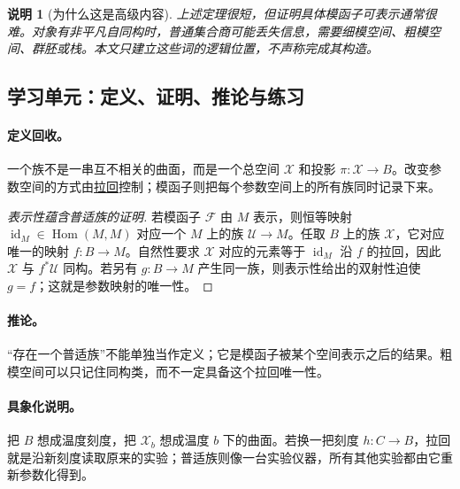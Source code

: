 \documentclass[UTF8,fontset=none,a4paper,11pt]{ctexart}
\theoremstyle{foundation-definition}
\theoremstyle{foundation-theorem}
\theoremstyle{foundation-proposition}
\theoremstyle{foundation-example}
\theoremstyle{foundation-remark}
\newtheorem{remark}[definition]{说明}
\theoremstyle{foundation-theorem}
\newcommand{\term}[2]{\hyperref[#1]{#2}}
\begin{document}
\begin{remark}[为什么这是高级内容]
上述定理很短，但证明具体模函子可表示通常很难。对象有非平凡自同构时，普通集合商可能丢失信息，需要细模空间、粗模空间、群胚或栈。本文只建立这些词的逻辑位置，不声称完成其构造。
\end{remark}

\subsection{学习单元：定义、证明、推论与练习}

\paragraph{定义回收。}
一个族不是一串互不相关的曲面，而是一个总空间 \(\mathcal X\) 和投影 \(\pi:\mathcal X\to B\)。改变参数空间的方式由\term{def:pullback}{拉回}控制；模函子则把每个参数空间上的所有族同时记录下来。

\begin{proof}[表示性蕴含普适族的证明]
若模函子 \(\mathcal F\) 由 \(M\) 表示，则恒等映射 \(\operatorname{id}_M\in\operatorname{Hom}(M,M)\) 对应一个 \(M\) 上的族 \(\mathcal U\to M\)。任取 \(B\) 上的族 \(\mathcal X\)，它对应唯一的映射 \(f:B\to M\)。自然性要求 \(\mathcal X\) 对应的元素等于 \(\operatorname{id}_M\) 沿 \(f\) 的拉回，因此 \(\mathcal X\) 与 \(f^*\mathcal U\) 同构。若另有 \(g:B\to M\) 产生同一族，则表示性给出的双射性迫使 \(g=f\)；这就是参数映射的唯一性。
\end{proof}

\paragraph{推论。}
“存在一个普适族”不能单独当作定义；它是模函子被某个空间表示之后的结果。粗模空间可以只记住同构类，而不一定具备这个拉回唯一性。

\paragraph{具象化说明。}
把 \(B\) 想成温度刻度，把 \(\mathcal X_b\) 想成温度 \(b\) 下的曲面。若换一把刻度 \(h:C\to B\)，拉回就是沿新刻度读取原来的实验；普适族则像一台实验仪器，所有其他实验都由它重新参数化得到。
\end{document}

